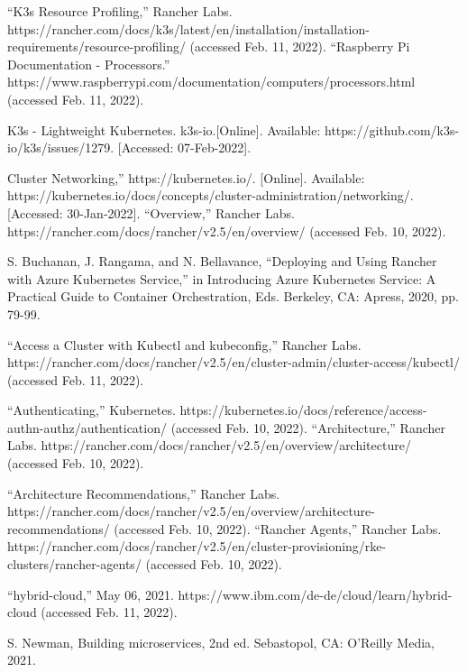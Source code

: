 \documentclass[12pt,oneside]{report}
\begin{document}
\begin{thebibliography}{10}
    “K3s Resource Profiling,” Rancher Labs. https://rancher.com/docs/k3s/latest/en/installation/installation-requirements/resource-profiling/ (accessed Feb. 11, 2022).
    “Raspberry Pi Documentation - Processors.” https://www.raspberrypi.com/documentation/computers/processors.html (accessed Feb. 11, 2022).


     K3s - Lightweight Kubernetes. k3s-io.[Online]. Available: https://github.com/k3s-io/k3s/issues/1279. [Accessed: 07-Feb-2022].
    
     Cluster Networking,” https://kubernetes.io/. [Online]. 
    Available: https://kubernetes.io/docs/concepts/cluster-administration/networking/.[Accessed: 30-Jan-2022].
    “Overview,” Rancher Labs. https://rancher.com/docs/rancher/v2.5/en/overview/ (accessed Feb. 10, 2022).
    
    S. Buchanan, J. Rangama, and N. Bellavance, 
    “Deploying and Using Rancher with Azure Kubernetes Service,” in Introducing Azure Kubernetes Service: A Practical Guide to Container Orchestration, Eds. Berkeley, CA: Apress, 2020, pp. 79-99.

    “Access a Cluster with Kubectl and kubeconfig,” Rancher Labs. https://rancher.com/docs/rancher/v2.5/en/cluster-admin/cluster-access/kubectl/ (accessed Feb. 11, 2022).


    “Authenticating,” Kubernetes. https://kubernetes.io/docs/reference/access-authn-authz/authentication/ (accessed Feb. 10, 2022).
    “Architecture,” Rancher Labs. https://rancher.com/docs/rancher/v2.5/en/overview/architecture/ (accessed Feb. 10, 2022).

    “Architecture Recommendations,” Rancher Labs. https://rancher.com/docs/rancher/v2.5/en/overview/architecture-recommendations/ (accessed Feb. 10, 2022).
    “Rancher Agents,” Rancher Labs. https://rancher.com/docs/rancher/v2.5/en/cluster-provisioning/rke-clusters/rancher-agents/ (accessed Feb. 10, 2022).
 
  “hybrid-cloud,” May 06, 2021. https://www.ibm.com/de-de/cloud/learn/hybrid-cloud (accessed Feb. 11, 2022).


  S. Newman, Building microservices, 2nd ed. Sebastopol, CA: O’Reilly Media, 2021.

  \end{thebibliography}
  \newpage
  
  \listoffigures
  \newpage

  \listoftables
  \newpage

  
\end{document}
